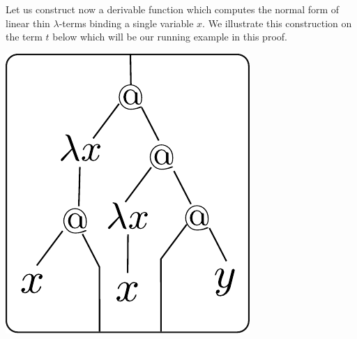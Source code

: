 Let us construct now a derivable function which computes the normal form of linear thin $\lambda$-terms binding a single variable $x$. We illustrate this construction on the term $t$ below which will be our running example in this proof. 
\begin{center}
\includegraphics[scale=.4]{pictures/running-thin}
\end{center}

